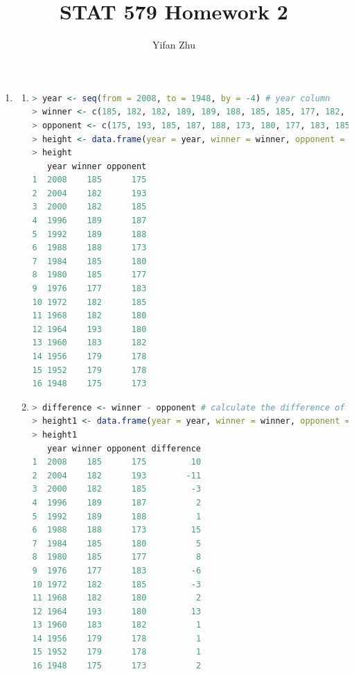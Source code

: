 \documentclass{article}
\begin{document}
	

	
	\title{STAT 579 Homework 2}
	\author{Yifan Zhu}
	\maketitle
	
	\begin{enumerate}[leftmargin = 0 em, label = \arabic*., font = \bfseries]

	\item \begin{enumerate}
	\item 
	\begin{lstlisting}[language = R]
> year <- seq(from = 2008, to = 1948, by = -4) # year column
> winner <- c(185, 182, 182, 189, 189, 188, 185, 185, 177, 182, 182, 193, 183, 179, 179, 175) # winners' heights
> opponent <- c(175, 193, 185, 187, 188, 173, 180, 177, 183, 185, 180, 180, 182, 178, 178, 173) # opponents' heights
> height <- data.frame(year = year, winner = winner, opponent = opponent)
> height
   year winner opponent
1  2008    185      175
2  2004    182      193
3  2000    182      185
4  1996    189      187
5  1992    189      188
6  1988    188      173
7  1984    185      180
8  1980    185      177
9  1976    177      183
10 1972    182      185
11 1968    182      180
12 1964    193      180
13 1960    183      182
14 1956    179      178
15 1952    179      178
16 1948    175      173
	\end{lstlisting}

	\item 
\begin{lstlisting}[language = R]
> difference <- winner - opponent # calculate the difference of heights
> height1 <- data.frame(year = year, winner = winner, opponent = opponent, difference = difference) # create new date frame with difference of heights
> height1
   year winner opponent difference
1  2008    185      175         10
2  2004    182      193        -11
3  2000    182      185         -3
4  1996    189      187          2
5  1992    189      188          1
6  1988    188      173         15
7  1984    185      180          5
8  1980    185      177          8
9  1976    177      183         -6
10 1972    182      185         -3
11 1968    182      180          2
12 1964    193      180         13
13 1960    183      182          1
14 1956    179      178          1
15 1952    179      178          1
16 1948    175      173          2
\end{lstlisting}


\end{enumerate}
\end{enumerate}
\end{document}
